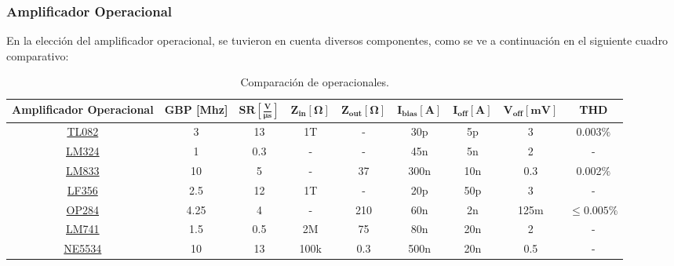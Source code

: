 \subsubsection{Amplificador Operacional}
En la elección del amplificador operacional, se tuvieron en cuenta diversos componentes, como se ve a continuación en el siguiente cuadro comparativo:
\begin{table}[H]
\hspace*{-0.5cm}
\begin{tabular}{ccccccccc}
\hline
\textbf{Amplificador Operacional} & \textbf{GBP [Mhz]} & $\mathbf{SR [\frac{V}{\mu s}]}$ & $\mathbf{Z_{in} [\Omega]}$ & $\mathbf{Z_{out}[\Omega]}$ & $\mathbf{I_{bias}[A]}$ & $\mathbf{I_{off}[A]}$ & $\mathbf{V_{off}[mV]}$ & \textbf{THD} \\ \hline
\href{http://www.ti.com/lit/ds/symlink/tl082-n.pdf}{TL082}                   & 3                  & 13                              & 1T                         & -                          & 30p                 & 5p                    & 3                      & 0.003$\%$    \\
\href{http://www.ti.com/lit/ds/symlink/lm324-n.pdf}{LM324}                    & 1                  & 0.3                             & -                          & -                          & 45n                  & 5n                     & 2                      & -            \\
\href{http://www.ti.com/lit/ds/symlink/lm833.pdf}{LM833}                    & 10                 & 5                               & -                          & 37                         & 300n                & 10n                   & 0.3                    & 0.002$\%$    \\
\href{http://www.ti.com/lit/ds/symlink/lf356-mil.pdf}{LF356}                    & 2.5                & 12                              & 1T                         & -                          & 20p                 & 50p                   & 3                      & -            \\
\href{https://www.alldatasheet.com/datasheet-pdf/pdf/49039/AD/OP284.html}{OP284}                    & 4.25                & 4                              & -                         & 210 & 60n                 & 2n                   & 125m                      & $\leq 0.005\%$           \\
\href{http://www.ti.com/lit/ds/symlink/lm741.pdf}{LM741}                    & 1.5                & 0.5                             & 2M                         & 75                         & 80n                 & 20n                   & 2                      & -            \\
\href{http://www.ti.com/lit/ds/slos070d/slos070d.pdf}{NE5534}                   & 10                 & 13                              & 100k                       & 0.3                        & 500n                & 20n                   & 0.5                    & -           \\
\hline
\end{tabular}
\caption{Comparación de operacionales.}
\end{table}
